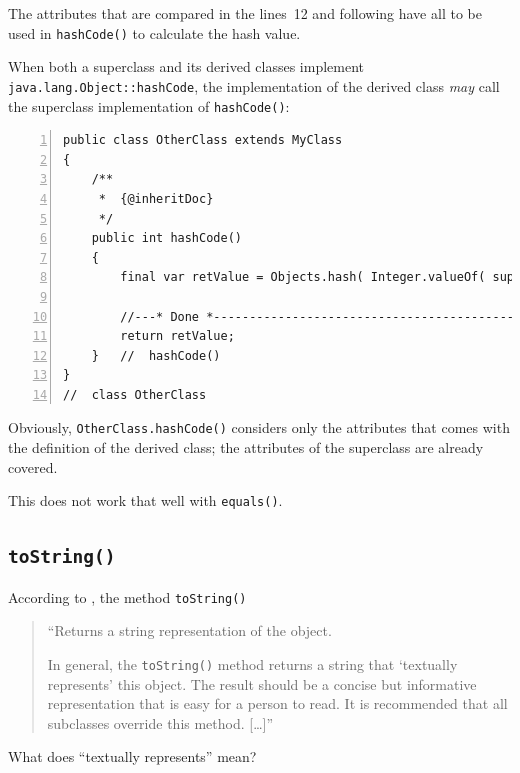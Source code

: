 \documentclass[11pt,a4paper, titlepage, parskip=half, headsepline, footsepline, cleardoublepage=current, headheight=1cm]{scrbook}
\begin{document}
The attributes that are compared in the lines~12 and following have all to be used in \lstinline|hashCode()| to calculate the hash value.

When both a superclass and its derived classes implement \lstinline|java.lang.Object::hashCode|, the implementation of the derived class \textit{may} call the superclass implementation of \lstinline|hashCode()|:
\begin{lstlisting}[numbers=left]
public class OtherClass extends MyClass
{
    /**
     *  {@inheritDoc}
     */
    public int hashCode()
    {
        final var retValue = Objects.hash( Integer.valueOf( super.hashCode ), <attribute>, < … > );
        
        //---* Done *------------------------------------------------
        return retValue;
    }   //  hashCode()    
}
//  class OtherClass
\end{lstlisting}
Obviously, \lstinline|OtherClass.hashCode()| considers only the attributes that comes with the definition of the derived class; the attributes of the superclass are already covered.

This does not work that well with \lstinline|equals()|.


\subsection{\lstinline|toString()|}\label{sec:ToString}
According to \autocite{ORACLE_DOC_OBJECT:toString}, the method \lstinline|toString()|
\begin{quote}
“Returns a string representation of the object.

In general, the \lstinline|toString()| method returns a string that ‘textually represents’ this object. The result should be a concise but informative representation that is easy for a person to read. It is recommended that all subclasses override this method. […]”
\end{quote}

What does “textually represents” mean?
\end{document}
